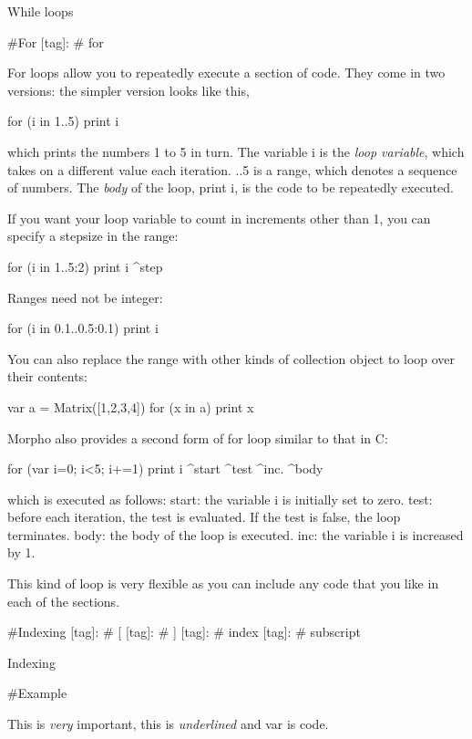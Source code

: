 While loops

\#\+For \mbox{[}tag\mbox{]}\+: \# for

For loops allow you to repeatedly execute a section of code. They come in two versions\+: the simpler version looks like this, \begin{DoxyVerb}for (i in 1..5) print i
\end{DoxyVerb}


which prints the numbers 1 to 5 in turn. The variable {\ttfamily i} is the {\itshape loop variable}, which takes on a different value each iteration. {..5} is a range, which denotes a sequence of numbers. The {\itshape body} of the loop, {\ttfamily print i}, is the code to be repeatedly executed. ~\newline


If you want your loop variable to count in increments other than 1, you can specify a stepsize in the range\+: \begin{DoxyVerb}for (i in 1..5:2) print i
               ^step 
\end{DoxyVerb}


Ranges need not be integer\+: \begin{DoxyVerb}for (i in 0.1..0.5:0.1) print i
\end{DoxyVerb}


You can also replace the range with other kinds of collection object to loop over their contents\+: \begin{DoxyVerb}var a = Matrix([1,2,3,4])
for (x in a) print x
\end{DoxyVerb}


Morpho also provides a second form of {\ttfamily for} loop similar to that in C\+: \begin{DoxyVerb}for (var i=0; i<5; i+=1) { print i }
     ^start   ^test ^inc.  ^body
\end{DoxyVerb}


which is executed as follows\+: start\+: the variable {\ttfamily i} is initially set to zero. test\+: before each iteration, the test is evaluated. If the test is {\ttfamily false}, the loop terminates. body\+: the body of the loop is executed. inc\+: the variable {\ttfamily i} is increased by 1.

This kind of loop is very flexible as you can include any code that you like in each of the sections.

\#\+Indexing \mbox{[}tag\mbox{]}\+: \# \mbox{[} \mbox{[}tag\mbox{]}\+: \# \mbox{]} \mbox{[}tag\mbox{]}\+: \# index \mbox{[}tag\mbox{]}\+: \# subscript

Indexing

\#\+Example

This is {\itshape very} important, this is {\itshape underlined} and {\ttfamily var} is code. 